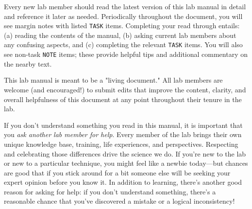 \documentclass{tufte-book} %
\begin{document}
\noindent {}
Every new lab member should read
the latest version of this lab manual in detail and reference it later
as needed.  Periodically throughout the document, you will see margin
notes with listed \texttt{TASK} items.  Completing your read through
entails: (a) reading the contents of the manual, (b) asking current
lab members about any confusing aspects, and (c) completing the
relevant \texttt{TASK} items.  You will also see non-task
\texttt{NOTE} items; these provide helpful tips and additional
commentary on the nearby text.

This lab manual is meant to be a "living document." All lab members are welcome (and encouraged!) to submit edits that improve the content, clarity, and overall helpfulness of this document at any point throughout their tenure in the lab.


\noindent {} If you don't understand something you
read in this manual, it is important that you \textit{ask another lab
  member for help}.  Every member of the lab brings their own unique
knowledge base, training, life experiences, and perspectives.
Respecting and celebrating those differences drive the science we do.
If you're new to the lab or new to a particular technique, you might
feel like a newbie today---but chances are good that if you stick
around for a bit someone else will be seeking your expert opinion
before you know it.  In addition to learning, there's another good
reason for asking for help: if you don't understand something, there's
a reasonable chance that you've discovered a mistake or a logical
inconsistency!
\end{document}
